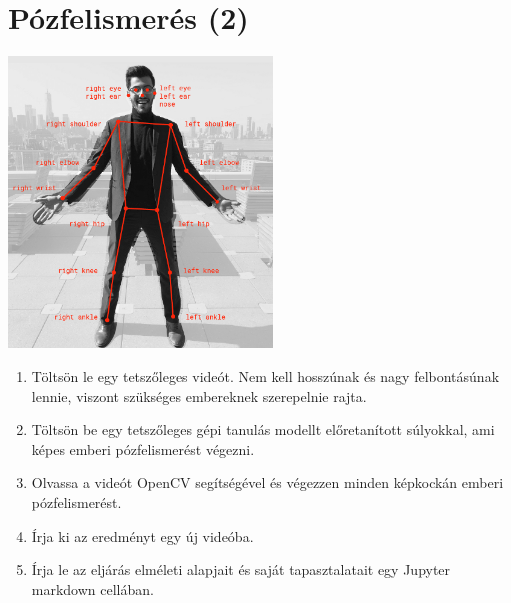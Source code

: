 \documentclass[english]{article}
\begin{document}
\section{Pózfelismerés (2)}
\begin{center}
\includegraphics[width=7cm, keepaspectratio]{images/pose_detection.png}
\end{center}
\begin{enumerate}
	\item Töltsön le egy tetszőleges videót. Nem kell hosszúnak és nagy felbontásúnak lennie, viszont szükséges embereknek szerepelnie rajta. 
	\item Töltsön be egy tetszőleges gépi tanulás modellt előretanított súlyokkal, ami képes emberi pózfelismerést végezni.
	\item Olvassa a videót OpenCV segítségével és végezzen minden képkockán emberi pózfelismerést.
	\item Írja ki az eredményt egy új videóba. 
	\item Írja le az eljárás elméleti alapjait és saját tapasztalatait egy Jupyter markdown cellában.
\end{enumerate}
\end{document}
